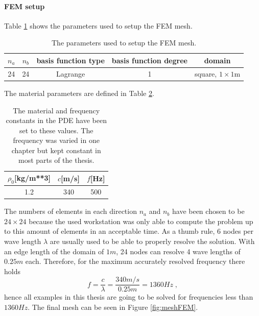 \documentclass[%
  a4paper,oneside,%
  11pt,%
  smallchapters,
  style=printdev,
  extramargin,
  green,%
  rgb, <cmyk>
  ]{tubsbook}
\begin{document}
\paragraph{FEM setup}
Table \ref{tab:FEMSetup} shows the parameters used to setup the FEM mesh.  
\begin{table}[]
\centering
\caption{The parameters used to setup the FEM mesh.}
\label{tab:FEMSetup}
\begin{tabular}{@{}ccccc@{}}
\toprule
$n_a$ & $n_b$ & basis function type & basis function degree & domain               \\ \midrule
24    & 24    & Lagrange            & 1                     & square, $1\times 1$m \\ \bottomrule
\end{tabular}
\end{table}
The material parameters are defined in Table \ref{tab:MatSetup}.
\begin{table}[]
\centering
\caption{The material and frequency constants in the PDE have been set to these values. The frequency was varied in one chapter but kept constant in most parts of the thesis.}
\label{tab:MatSetup}
\begin{tabular}{@{}ccc@{}}
\toprule
$\rho_0${[}kg/m**3{]} & $c${[}m/s{]} & $f${[}Hz{]} \\ \midrule
1.2                   & 340          & 500         \\ \bottomrule
\end{tabular}
\end{table}
The numbers of elements in each direction $n_a$ and $n_b$ have been chosen to be $24\times 24$ because the used workstation was only able to compute the problem up to this amount of elements in an acceptable time. As a thumb rule, 6 nodes per wave length $\lambda$ are usually used to be able to properly resolve the solution. \cite{Marburga} With an edge length of the domain of $1m$, 24 nodes can resolve 4 wave lengths of $0.25m$ each. Therefore, for the maximum accurately resolved frequency there holds 
\begin{equation}
f = \frac{c}{\lambda} = \frac{340m/s}{0.25m} = 1360Hz \;,
\end{equation}
hence all examples in this thesis are going to be solved for frequencies less than $1360Hz$.
The final mesh can be seen in Figure \ref{fig:meshFEM}.
\end{document}
